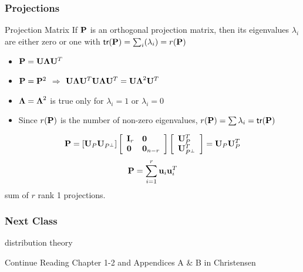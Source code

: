 \documentclass[handout]{beamer}
\begin{document}
\begin{frame}
  \frametitle{Projections}
\begin{block}{Projection Matrix}
If $\P$ is an orthogonal projection matrix, then its eigenvalues
$\lambda_i$ are
either zero or one with $\tr (\P) = \sum_i(\lambda_i) = r(\P)$
\end{block} \pause
\begin{itemize}
\item   $\P = \U \Lambdab \U^T $  \pause
\item $\P = \P^2$  $\Rightarrow$ $\U \Lambdab \U^T\U \Lambdab \U^T =
  \U\Lambdab^2\U^T$  \pause
\item $\Lambdab = \Lambdab^2$ is true only for $\lambda_i = 1$ or
  $\lambda_i =0$  \pause
\item Since $r(\P)$ is the number of non-zero eigenvalues, $r(\P) =
  \sum \lambda_i = \tr(\P)$  \pause
\end{itemize}
$$\P = \left[\U_P \U_{P^\perp} \right]
\left[
  \begin{array}{ll}
    \I_r & \zero \\
    \zero & \zero_{n-r}
  \end{array}
\right] \left[
  \begin{array}{l}
    \U_P^T \\
\U^T_{P^\perp}
  \end{array}
\right] = \U_P \U^T_P$$
$$\P = \sum_{i=1}^r \u_i \u_i^T$$
sum of $r$ rank 1 projections.
\end{frame}

\begin{frame}\frametitle{Next Class}

  distribution theory

  Continue Reading Chapter 1-2 and Appendices A \& B in Christensen
\end{frame}
\end{document}
